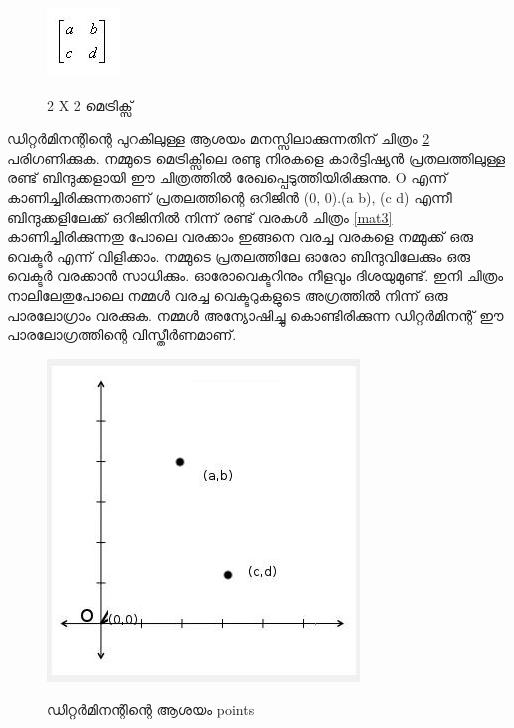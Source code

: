\documentclass[10pt,a4paper]{report}
\begin{document}
                    
    \begin{figure}[H]
  \center
\includegraphics[scale=.5]{images/m1}
\label{mat1}
\caption{2 X 2 മെട്രിക്സ്}
\end{figure}
   ഡിറ്റർമിനന്റിന്റെ പുറകിലുള്ള ആശയം മനസ്സിലാക്കുന്നതിന് ചിത്രം \ref{mat2} പരിഗണിക്കുക. നമ്മുടെ മെട്രിക്സിലെ രണ്ടു നിരകളെ കാർട്ടിഷ്യൻ പ്രതലത്തിലുള്ള രണ്ട് ബിന്ദുക്കളായി ഈ ചിത്രത്തിൽ രേഖപ്പെടുത്തിയിരിക്കുന്നു. O എന്ന് കാണിച്ചിരിക്കുന്നതാണ് പ്രതലത്തിന്റെ ഒറിജിൻ (0, 0).(a b), (c d) എന്നീ ബിന്ദുക്കളിലേക്ക് ഒറിജിനിൽ നിന്ന് രണ്ട് വരകൾ ചിത്രം \ref{mat3}  കാണിച്ചിരിക്കുന്നതു പോലെ വരക്കാം ഇങ്ങനെ വരച്ച വരകളെ നമ്മുക്ക് ഒരു വെക്ടർ എന്ന് വിളിക്കാം. നമ്മുടെ പ്രതലത്തിലേ ഓരോ ബിന്ദുവിലേക്കും ഒരു വെക്ടർ വരക്കാൻ സാധിക്കും. ഓരോവെക്ടറിനും നീളവും ദിശയുമുണ്ട്. ഇനി ചിത്രം നാലിലേതുപോലെ നമ്മൾ വരച്ച വെക്ടറുകളുടെ അഗ്രത്തിൽ നിന്ന് ഒരു പാരലോഗ്രാം വരക്കുക. നമ്മൾ അന്യോഷിച്ചു കൊണ്ടിരിക്കുന്ന ഡിറ്റർമിനന്റ് ഈ പാരലോഗ്രത്തിന്റെ വിസ്തീർണമാണ്.
   
                       
    \begin{figure}[H]
  \center
\includegraphics[scale=.5]{images/m2}
\label{mat2}
\caption{ ഡിറ്റർമിനന്റിന്റെ  ആശയം points }
\end{figure}
   
\end{document}
